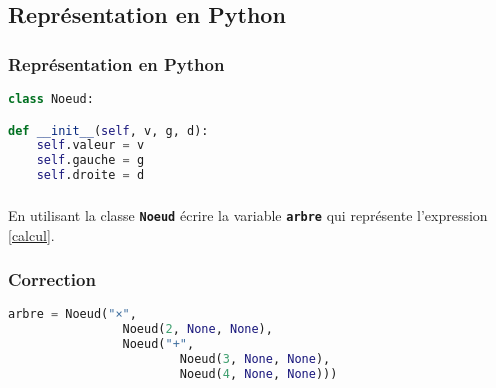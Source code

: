 \documentclass[svgnames,11pt]{beamer}
\begin{document}
\subsection{Représentation en Python}
\begin{frame}[fragile]
    \frametitle{Représentation en Python}

    \begin{center}
        \begin{lstlisting}[language=Python , basicstyle=\ttfamily\small, xleftmargin=1em, xrightmargin=1em]
class Noeud:

def __init__(self, v, g, d):
    self.valeur = v
    self.gauche = g
    self.droite = d
\end{lstlisting}
        \label{CODE}
    \end{center}

\end{frame}
\begin{frame}
    \frametitle{}
    \begin{center}
        \label{calcul}
    \end{center}
\begin{activite}
En utilisant la classe \textbf{\texttt{Noeud}} écrire la variable \textbf{\texttt{arbre}} qui représente l'expression \ref{calcul}.
\end{activite}

\end{frame}
\begin{frame}[fragile]
    \frametitle{Correction}

\begin{center}
\begin{lstlisting}[language=Python , basicstyle=\ttfamily\small, xleftmargin=1em, xrightmargin=0em]
arbre = Noeud("×",
                Noeud(2, None, None),
                Noeud("+",
                        Noeud(3, None, None),
                        Noeud(4, None, None)))
\end{lstlisting}
\end{center}    

\end{frame}
\end{document}
